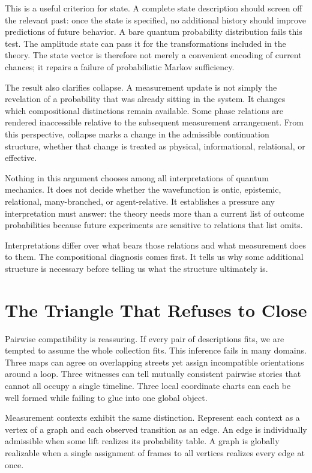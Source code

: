 \documentclass[12pt,openany]{book}
\begin{document}
This is a useful criterion for state. A complete state description should screen off the relevant past: once the state is specified, no additional history should improve predictions of future behavior. A bare quantum probability distribution fails this test. The amplitude state can pass it for the transformations included in the theory. The state vector is therefore not merely a convenient encoding of current chances; it repairs a failure of probabilistic Markov sufficiency.

The result also clarifies collapse. A measurement update is not simply the revelation of a probability that was already sitting in the system. It changes which compositional distinctions remain available. Some phase relations are rendered inaccessible relative to the subsequent measurement arrangement. From this perspective, collapse marks a change in the admissible continuation structure, whether that change is treated as physical, informational, relational, or effective.

Nothing in this argument chooses among all interpretations of quantum mechanics. It does not decide whether the wavefunction is ontic, epistemic, relational, many-branched, or agent-relative. It establishes a pressure any interpretation must answer: the theory needs more than a current list of outcome probabilities because future experiments are sensitive to relations that list omits.

Interpretations differ over what bears those relations and what measurement does to them. The compositional diagnosis comes first. It tells us why some additional structure is necessary before telling us what the structure ultimately is.

\chapter{The Triangle That Refuses to Close}
Pairwise compatibility is reassuring. If every pair of descriptions fits, we are tempted to assume the whole collection fits. This inference fails in many domains. Three maps can agree on overlapping streets yet assign incompatible orientations around a loop. Three witnesses can tell mutually consistent pairwise stories that cannot all occupy a single timeline. Three local coordinate charts can each be well formed while failing to glue into one global object.

Measurement contexts exhibit the same distinction. Represent each context as a vertex of a graph and each observed transition as an edge. An edge is individually admissible when some lift realizes its probability table. A graph is globally realizable when a single assignment of frames to all vertices realizes every edge at once.
\end{document}
